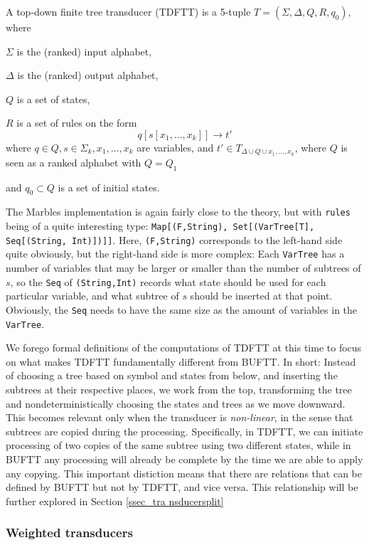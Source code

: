 A top-down finite tree transducer (TDFTT) is a 5-tuple $T = (\Sigma,
\Delta, Q, R, q_0)$, where
\begin{compactitem}
\item $\Sigma$ is the (ranked) input alphabet,
\item $\Delta$ is the (ranked) output alphabet,
\item $Q$ is a set of states,
\item $R$ is a set of rules on the form
$$q[s[x_1,\ldots,x_k]] \rightarrow t'$$ where
$q \in Q, s \in \Sigma_k, x_1,\ldots,x_k$ are variables, and
$t' \in T_{\Delta \cup Q \cup {x_1,\ldots,x_k}}$, where $Q$ is seen as a
ranked alphabet with $Q = Q_1$
\item and $q_0 \subset Q$ is a set of initial states.
\end{compactitem}

The Marbles implementation is again fairly close to the theory, but with
\texttt{rules} being of a quite interesting type: \texttt{Map[(F,String),
Set[(VarTree[T], Seq[(String, Int)])]]}. Here, \texttt{(F,String)}
corresponds to the left-hand side quite obviously, but the right-hand side
is more complex: Each \texttt{VarTree} has a number of variables that may
be larger or smaller than the number of subtrees of $s$, so the \texttt{Seq} of
\texttt{(String,Int)} records what state should be used for each particular
variable, and what subtree of $s$ should be inserted at that point.
Obviously, the \texttt{Seq} needs to have the same size as the amount of
variables in the \texttt{VarTree}.

We forego formal definitions of the computations of TDFTT at this time to
focus on what makes TDFTT fundamentally different from BUFTT. In short:
Instead of choosing a tree based on symbol and states from below, and
inserting the subtrees at their respective places, we work from the top,
transforming the tree and nondeterministically choosing the states and
trees as we move downward.  This becomes relevant only when the transducer
is \emph{non-linear}, in the sense that subtrees are copied during the
processing. Specifically, in TDFTT, we can initiate processing of two
copies of the same subtree using two different states, while in BUFTT any
processing will already be complete by the time we are able to apply any
copying. This important distiction means that there are relations that can
be defined by BUFTT but not by TDFTT, and vice versa. This relationship
will be further explored in Section \ref{ssec_tra nsducersplit}

\subsubsection{Weighted transducers}




